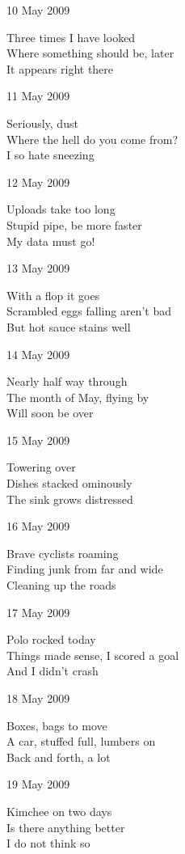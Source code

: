 \documentclass[12pt]{article}
\begin{document}
10 May 2009

Three times I have looked \\
Where something should be, later \\
It appears right there

\newpage

11 May 2009

Seriously, dust \\
Where the hell do you come from? \\
I so hate sneezing

12 May 2009

Uploads take too long \\
Stupid pipe, be more faster \\
My data must go!

13 May 2009

With a flop it goes \\
Scrambled eggs falling aren't bad \\
But hot sauce stains well

14 May 2009

Nearly half way through \\
The month of May, flying by \\
Will soon be over

15 May 2009

Towering over \\
Dishes stacked ominously \\
The sink grows distressed

16 May 2009

Brave cyclists roaming \\
Finding junk from far and wide \\
Cleaning up the roads

17 May 2009

Polo rocked today \\
Things made sense, I scored a goal \\
And I didn't crash

\newpage

18 May 2009

Boxes, bags to move \\
A car, stuffed full, lumbers on \\
Back and forth, a lot

19 May 2009

Kimchee on two days \\
Is there anything better \\
I do not think so
\end{document}
